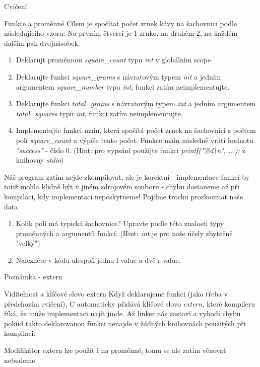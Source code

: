 \documentclass[9pt]{beamer}
\begin{document}
\begin{frame}{Cvičení}
    \begin{block}{Funkce a proměnné}
    Cílem je spočítat počet zrnek kávy na šachovnici podle následujícího vzoru:
    Na prvním čtverci je 1 zrnko, na druhém 2, na každém dalším pak dvojnásobek.
    \begin{enumerate}
        \item Deklarujt proměnnou \textit{square\_count} typu \textit{int} v globálním scope.
        \item Deklarujte funkci \textit{square\_grains} s návratovým typem \textit{int} a jedním argumentem \textit{square\_number} typu \textit{int}, funkci zatím neimplementujte.
        \item Deklarujte funkci \textit{total\_grains} s návratovým typem \textit{int} a jedním argumentem \textit{total\_squares} typu \textit{int}, funkci zatím neimplementujte.
        \item Implementujte funkci main, která spočítá počet zrnek na šachovnici s počtem polí \textit{square\_count} a výpíše tento počet. Funkce main následně vrátí hodnotu \textit{"success"} - číslo 0. (Hint: pro vypsání použíjte funkci \textit{printf("\%d\textbackslash{}n", ...);} z knihovny \textit{stdio})
    \end{enumerate}
    Náš program zatím nejde zkompilovat, ale je korektní - implementace funkcí by totiž mohla klidně být v jiném zdrojovém souboru - chybu dostaneme až při kompilaci, kdy implementaci neposkytneme!
    Pojďme trochu prozkoumat naše data
    \begin{enumerate}
        \item Kolik polí má typická šachovnice? Upravte podle této znalosti typy proměnných a argumentů funkcí. (Hint: \textit{int} je pro naše účely zbytečně "velký")
        \item Nalezněte v kódu alespoň jednu l-value a dvě r-value.
    \end{enumerate}
    \end{block}
\end{frame}

\begin{frame}{Poznámka - extern}
\begin{block}{Viditelnost a klíčové slovo extern}
    Když deklarujeme funkci (jako třeba v předchozím cvičení), C automaticky
    přidává klíčové slovo \textit{extern}, které kompileru říká, že může implementaci
    najít jinde. Až linker nás zastaví a vyhodí chybu pokud takto deklarovanou funkci
    nenajde v žádných knihovnách použitých při kompilaci.

    Modifikátor extern lze použít i na proměnné, tomu se ale zatím věnovat nebudeme.
\end{block}
\end{frame}
\end{document}
